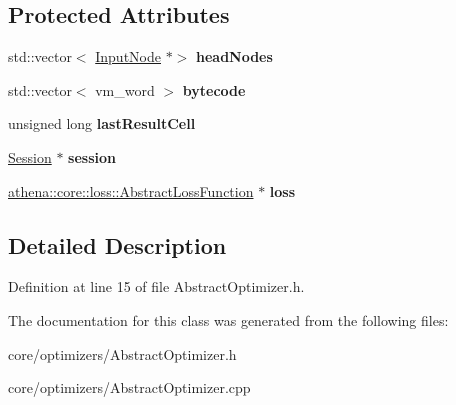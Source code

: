 \subsection*{Protected Attributes}
\begin{DoxyCompactItemize}
\item 
\mbox{\label{classathena_1_1core_1_1optimizers_1_1_abstract_optimizer_a531c36dd399081caeacfc8974805de79}} 
std\+::vector$<$ \mbox{\hyperlink{classathena_1_1core_1_1_input_node}{Input\+Node}} $\ast$$>$ {\bfseries head\+Nodes}
\item 
\mbox{\label{classathena_1_1core_1_1optimizers_1_1_abstract_optimizer_ad96008b4e5dec5e9bf5ece0cf4fdcba6}} 
std\+::vector$<$ vm\+\_\+word $>$ {\bfseries bytecode}
\item 
\mbox{\label{classathena_1_1core_1_1optimizers_1_1_abstract_optimizer_abd29bf7d7d1f9f553756b918f526e2fc}} 
unsigned long {\bfseries last\+Result\+Cell}
\item 
\mbox{\label{classathena_1_1core_1_1optimizers_1_1_abstract_optimizer_a7cc6da9a5944cf7eba19dc04814e478b}} 
\mbox{\hyperlink{classathena_1_1core_1_1_session}{Session}} $\ast$ {\bfseries session}
\item 
\mbox{\label{classathena_1_1core_1_1optimizers_1_1_abstract_optimizer_a9043b6609054109d6f590477bd62c975}} 
\mbox{\hyperlink{classathena_1_1core_1_1loss_1_1_abstract_loss_function}{athena\+::core\+::loss\+::\+Abstract\+Loss\+Function}} $\ast$ {\bfseries loss}
\end{DoxyCompactItemize}


\subsection{Detailed Description}


Definition at line 15 of file Abstract\+Optimizer.\+h.



The documentation for this class was generated from the following files\+:\begin{DoxyCompactItemize}
\item 
core/optimizers/Abstract\+Optimizer.\+h\item 
core/optimizers/Abstract\+Optimizer.\+cpp\end{DoxyCompactItemize}
